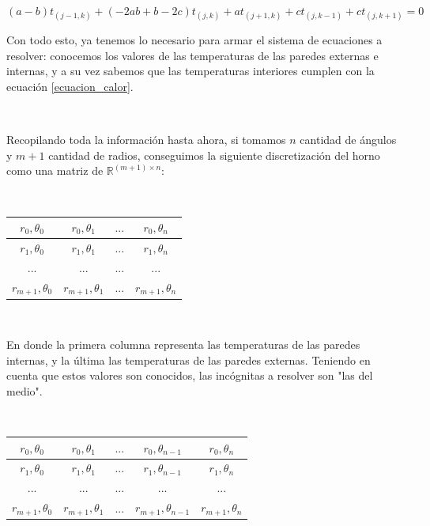 \begin{equation}\label{ecuacion_coeficientes}
     (a-b) t_{(j-1,k)} + (-2ab+b-2c) t_{(j,k)} + at_{(j+1,k)} + ct_{(j,k-1)} + ct_{(j,k+1)} = 0
\end{equation}

Con todo esto, ya tenemos lo necesario para armar el sistema de ecuaciones a resolver: conocemos los valores de las temperaturas de las paredes externas e internas, y a su vez sabemos que las temperaturas interiores cumplen con la ecuación \ref{ecuacion_calor}. 

\

Recopilando toda la información hasta ahora, si tomamos  $n$ cantidad de ángulos y $m+1$ cantidad de radios,  conseguimos la siguiente discretización del horno como una matriz de  $\mathbb{R}^{(m+1)\times n} $:

\

\begin{center}
    \begin{tabular}{ |c|c|c|c| }
        \hline
        $r_0,\theta_0$ & $r_0,\theta_1$ & $...$ & $r_0, \theta_n$ \\
        \hline
        $r_1,\theta_0$ & $r_1,\theta_1$ & $...$ & $r_1, \theta_n$\\
        \hline
        $...$ & $...$ & $...$ & $...$\\
        \hline
        $r_{m+1},\theta_0$ & $r_{m+1},\theta_1$ & $...$ & $r_{m+1}, \theta_n$\\
        \hline
    \end{tabular}
\end{center}

\

En donde la primera columna representa las temperaturas de las paredes internas, y la última las temperaturas de las paredes externas. Teniendo en cuenta que estos valores son conocidos, las incógnitas a resolver son "las del medio". 

\

\begin{center}
    \begin{tabular}{ |c|c|c|c|c| }
        \hline
        \color{blue}$r_0,\theta_0$ & $r_0,\theta_1$ & $...$ & $r_0, \theta_{n-1}$ & \color{blue}$r_0, \theta_n$ \\
        \hline
        \color{blue}$r_1,\theta_0$ & $r_1,\theta_1$ & $...$ & $r_1, \theta_{n-1}$ & \color{blue}$r_1, \theta_n$\\
        \hline
        \color{blue}$...$ & $...$ & $...$ & $...$ & \color{blue}$...$\\
        \hline
        \color{blue}$r_{m+1},\theta_0$ & $r_{m+1},\theta_1$ & $...$ & $r_{m+1}, \theta_{n-1}$ & \color{blue}$r_{m+1}, \theta_n$\\
        \hline
    \end{tabular}
\end{center}

